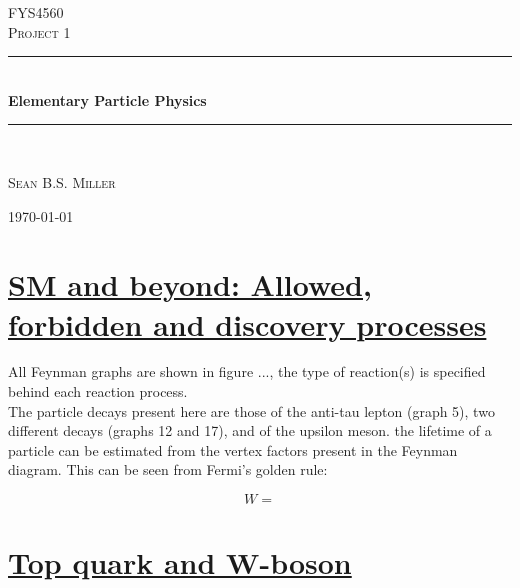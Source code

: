 \documentclass[11pt,a4paper]{article}
\newcommand{\HRule}{\rule{\linewidth}{0.5mm}}
\begin{document}
\begin{titlepage}
\begin{center}
\medskip
\textsc{\LARGE FYS4560}\\[1.5cm]

\textsc{\Large Project 1}\\[0.5cm]

\HRule \\[1.0cm]
{ \huge \bfseries Elementary Particle Physics \\[0.4cm] }
\HRule \huge \\[1.5cm]

\begin{minipage}{0.4\textwidth}
\begin{center}
\large\textsc{Sean B.S. Miller}\\

\end{center}
\end{minipage}

\vfill

{\large \today}

\end{center}
\end{titlepage}

\newpage

\fancyhead[C]{\textsc{\today}}
\fancyfoot[C]{\thepage}

\section{\underline{SM and beyond: Allowed, forbidden and discovery processes}}
All Feynman graphs are shown in figure ..., the type of reaction(s) is specified behind each reaction process.\\
The particle decays present here are those of the anti-tau lepton (graph 5), two different decays (graphs 12 and 17), and of the upsilon meson. the lifetime of a particle can be estimated from the vertex factors present in the Feynman diagram. This can be seen from Fermi's golden rule:

\begin{equation}
	W = 
\end{equation}



\section{\underline{Top quark and W-boson}}
\end{document}
